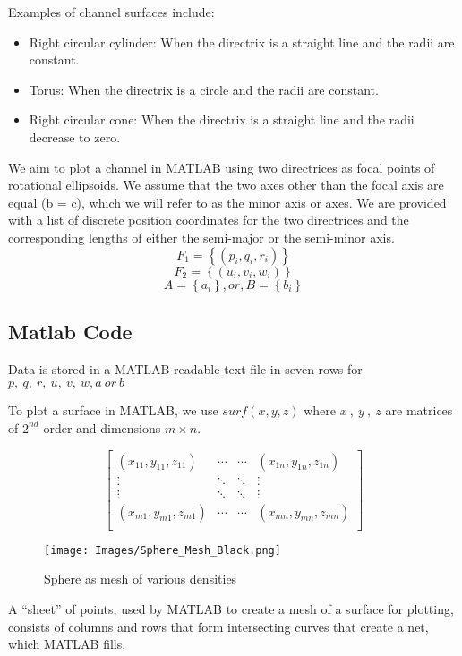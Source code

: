 \documentclass[a4paper]{article}
\begin{document}
Examples of channel surfaces include:
\begin{itemize}
    \item Right circular cylinder: When the directrix is a straight line and the radii are constant.
    \item Torus: When the directrix is a circle and the radii are constant.
    \item Right circular cone: When the directrix is a straight line and the radii decrease to zero.
\end{itemize}
We aim to plot a channel in MATLAB using two directrices as focal points of rotational ellipsoids. We assume that the two axes other than the focal axis are equal (b = c), which we will refer to as the minor axis or axes. We are provided with a list of discrete position coordinates for the two directrices and the corresponding lengths of either the semi-major or the semi-minor axis.
\[F_{1} = \left\{ \left( p_{i} , q_{i} , r_{i} \right) \right\}\]
\[F_{2} = \left\{ \left( u_{i} , v_{i} , w_{i} \right) \right\}\]
\[A = \left\{ a_{i} \right\} ,or, B = \left\{ b_{i} \right\}\]

\subsection{Matlab Code}
Data is stored in a MATLAB readable text file in seven rows for
\(p,\ q,\ r,\ u,\ v,\ w,a\ or\ b\)

To plot a surface in MATLAB, we use \(surf(x,y,z)\) where
\(x\ ,\ y\ ,\ z\) are matrices of \(2^{nd}\) order and dimensions
\(m \times n\).

\[\begin{bmatrix}
\left( x_{11} ,  y_{11} ,  z_{11}  \right) & \cdots & \cdots & \left( x_{1n} ,  y_{1n} ,  z_{1n}  \right) \\
 \vdots & \ddots & \ddots & \vdots \\
 \vdots & \ddots & \ddots & \vdots \\
\left(  x_{m1} , y_{m1} ,  z_{m1}  \right) & \cdots & \cdots & \left(  x_{mn} , y_{mn} , z_{mn}  \right) \\
\end{bmatrix}\]

\begin{figure}[h]
    \centering
    \texttt{[image: Images/Sphere\_Mesh\_Black.png]}
    \caption{Sphere as mesh of various densities}
\end{figure}

A “sheet” of points, used by MATLAB to create a mesh of a surface for plotting, consists of columns and rows that form intersecting curves that create a net, which MATLAB fills.
\end{document}
